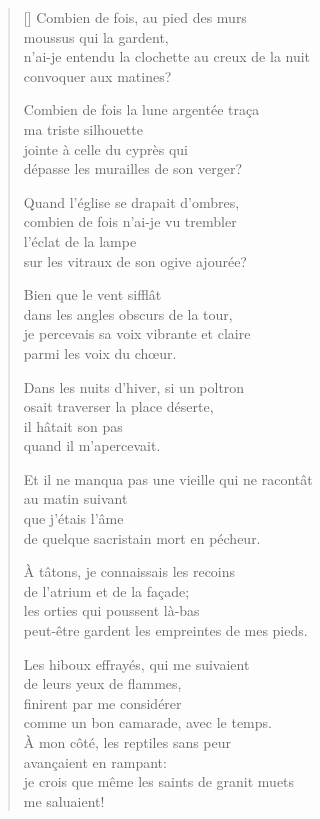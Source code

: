 \documentclass[a4paper,12pt]{book}
\begin{document}
\begin{verse}[\versewidth]
  Combien de fois, au pied des murs \\
  moussus qui la gardent, \\
  n'ai-je entendu la clochette au creux de la nuit \\
  convoquer aux matines?

  Combien de fois la lune argentée traça \\
  ma triste silhouette \\
  jointe à celle du cyprès qui \\
  dépasse les murailles de son verger?

  Quand l'église se drapait d'ombres, \\
  combien de fois n'ai-je vu trembler \\
  l'éclat de la lampe \\
  sur les vitraux de son ogive ajourée?

  Bien que le vent sifflât \\
  dans les angles obscurs de la tour, \\
  je percevais sa voix vibrante et claire \\
  parmi les voix du chœur.

  Dans les nuits d'hiver, si un poltron \\
  osait traverser la place déserte, \\
  il hâtait son pas \\
  quand il m'apercevait.

  Et il ne manqua pas une vieille qui ne racontât \\
  au matin suivant \\
  que j'étais l'âme \\
  de quelque sacristain mort en pécheur.

  À tâtons, je connaissais les recoins \\
  de l'atrium et de la façade; \\
  les orties qui poussent là-bas \\
  peut-être gardent les empreintes de mes pieds.

  Les hiboux effrayés, qui me suivaient \\
  de leurs yeux de flammes, \\
  finirent par me considérer \\
  comme un bon camarade, avec le temps. \\

  À mon côté, les reptiles sans peur \\
  avançaient en rampant: \\
  je crois que même les saints de granit muets \\
  me saluaient!
\end{verse}
\end{document}
